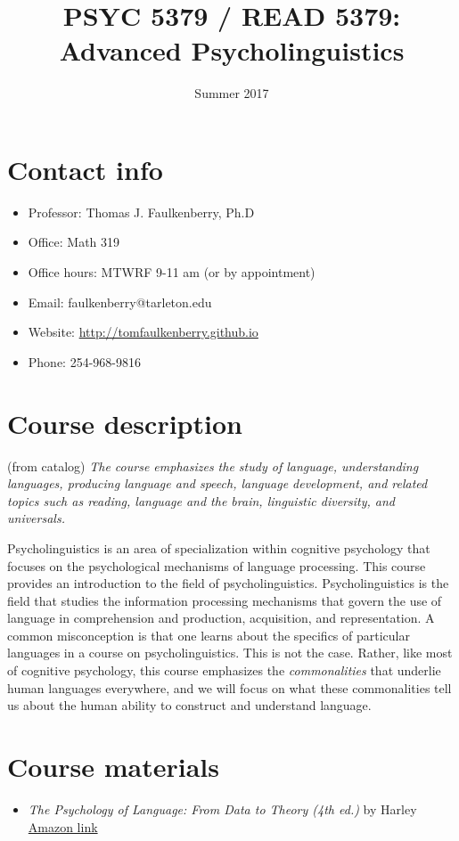\documentclass[10pt]{article}
\date{Summer 2017}
\title{PSYC 5379 / READ 5379: Advanced Psycholinguistics}
\begin{document}
\maketitle

\section*{Contact info}
\label{sec-1}
\begin{itemize}
\item Professor: Thomas J. Faulkenberry, Ph.D
\item Office: Math 319
\item Office hours: MTWRF 9-11 am (or by appointment)
\item Email: faulkenberry@tarleton.edu
\item Website: \url{http://tomfaulkenberry.github.io}
\item Phone: 254-968-9816
\end{itemize}

\section*{Course description}
\label{sec-2}

(from catalog) \emph{The course emphasizes the study of language, understanding languages, producing language and speech, language development, and related topics such as reading, language and the brain, linguistic diversity, and universals.}

Psycholinguistics is an area of specialization within cognitive psychology that focuses on the psychological mechanisms of language processing.  This course provides an introduction to the field of psycholinguistics. Psycholinguistics is the field that studies the information processing mechanisms that govern the use of language in comprehension and production, acquisition, and representation.  A common misconception is that one learns about the specifics of particular languages in a course on psycholinguistics.  This is not the case.  Rather, like most of cognitive psychology, this course emphasizes the \emph{commonalities} that underlie human languages everywhere, and we will focus on what these commonalities tell us about the human ability to construct and understand language. 

\section*{Course materials}
\label{sec-3}
\begin{itemize}
\item \emph{The Psychology of Language: From Data to Theory (4th ed.)} by Harley \href{https://www.amazon.com/Psychology-Language-Data-Theory/dp/1848720890}{Amazon link}
\end{itemize}
\end{document}
